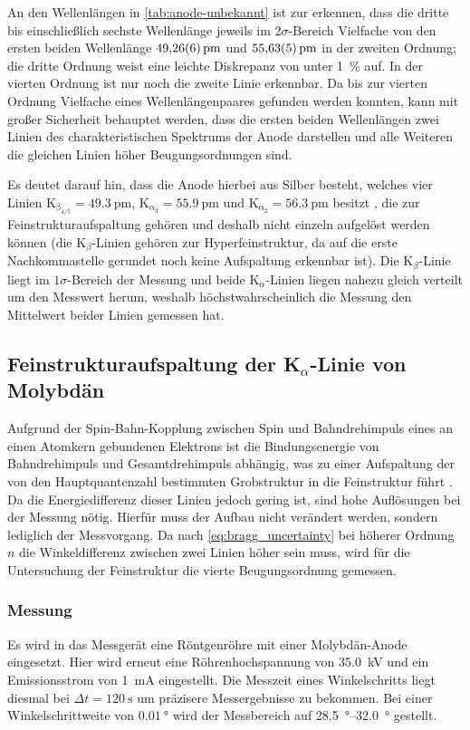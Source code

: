 An den Wellenlängen in \cref{tab:anode-unbekannt} ist zur erkennen, dass die dritte bis einschließlich 
sechste Wellenlänge jeweils im $2\sigma$-Bereich Vielfache von den ersten beiden Wellenlänge $\SI{49.26\pm 0.06}{\pm}$
und $\SI{55.63\pm 0.05}{\pm}$ in der zweiten Ordnung; die dritte Ordnung weist eine leichte Diskrepanz von 
unter \SI{1}{\percent} auf. In der vierten Ordnung ist nur noch die zweite Linie erkennbar. Da bis zur vierten 
Ordnung Vielfache eines Wellenlängenpaares gefunden werden konnten, kann mit großer Sicherheit 
behauptet werden, dass die ersten beiden Wellenlängen zwei Linien des charakteristischen Spektrums 
der Anode darstellen und alle Weiteren die gleichen Linien höher Beugungsordnungen sind.\par
Es deutet darauf hin, dass die Anode hierbei aus Silber besteht, welches 
vier Linien K$_\mathrm{\beta_{4/5}} = \SI{49.3}{\pm}$,  K$_\mathrm{\alpha_3}=\SI{55.9}{\pm}$
und K$_\mathrm{\alpha_2}=\SI{56.3}{\pm}$ besitzt \cite{nist_xray_database}, die zur Feinstrukturaufspaltung gehören und 
deshalb nicht einzeln aufgelöst werden können (die K$_\beta$-Linien gehören zur 
Hyperfeinstruktur, da auf die erste Nachkommastelle gerundet noch keine 
Aufspaltung erkennbar ist). Die K$_\beta$-Linie liegt im $1\sigma$-Bereich 
der Messung und beide K$_\alpha$-Linien liegen nahezu gleich verteilt um den Messwert herum, weshalb 
höchstwahrscheinlich die Messung den Mittelwert beider Linien gemessen hat.

\subsection{Feinstrukturaufspaltung der K$_\alpha$-Linie von Molybdän}
Aufgrund der Spin-Bahn-Kopplung zwischen Spin und Bahndrehimpuls eines an einen Atomkern 
gebundenen Elektrons ist die Bindungsenergie von Bahndrehimpuls und Gesamtdrehimpuls abhängig, was 
zu einer Aufspaltung der von den Hauptquantenzahl bestimmten Grobstruktur in die Feinstruktur führt
\cite{Demtröder:829119}. Da die Energiedifferenz dieser Linien jedoch gering ist, sind hohe 
Auflösungen bei der Messung nötig. Hierfür muss der Aufbau nicht verändert werden, sondern lediglich 
der Messvorgang. Da nach \cref{eq:bragg_uncertainty} bei höherer Ordnung $n$ die Winkeldifferenz zwischen 
zwei Linien höher sein muss, wird für die Untersuchung der Feinstruktur die vierte Beugungsordnung gemessen.

\subsubsection{Messung}
Es wird in das Messgerät eine Röntgenröhre mit einer Molybdän-Anode eingesetzt. Hier wird 
erneut eine Röhrenhochspannung von \SI{35.0}{\kilo\volt} und
ein Emissionsstrom von \SI{1}{\milli\ampere} eingestellt. Die Messzeit eines Winkelschritts liegt diesmal
bei $\Delta t = \SI{120}{\second}$ um präzisere Messergebnisse zu bekommen.
Bei einer Winkelschrittweite von $\SI{0.01}{\degree}$ wird der Messbereich auf \qtyrange{28.5}{32.0}{\degree} gestellt.

